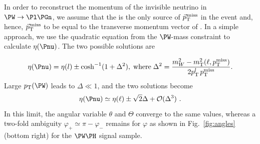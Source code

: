 \documentclass[a4paper,11pt]{article}
\begin{document}
In order to reconstruct the momentum of the invisible neutrino in $\PW\rightarrow\Pl\Pgn$, we assume that the \Pnu is the only source of ${\vec p}_{\mathrm{T}}^{\kern1pt\text{miss}}$ in the event and, hence, ${\vec p}_{\mathrm{T}}^{\kern1pt\text{miss}}$ to be equal to the transverse momentum vector of \Pnu. 
In a simple approach, we use the quadratic equation from the $\PW$-mass constraint to calculate $\eta(\Pnu)$. 
The two possible solutions are

\begin{equation}
\eta(\Pnu) = {\eta}(l) \pm \cosh^{-1}(1+{\Delta}^2),\;\textrm{where}\;{\Delta}^2 = \frac{m_W^2 - m_\textrm{T}^2 (\ell,{p_\textrm{T}^\text{miss}\xspace})}{2 p_\textrm{T}^{l}\, p_\textrm{T}^\textrm{miss}}. 
\label{Eq:NeuEta}
\end{equation}
Large $\pt(\PW)$ leads to $\Delta \ll 1$, and the two solutions become 
\begin{equation}
{\eta}(\Pnu) \simeq {\eta}(\ell) \pm \sqrt{2}{\Delta} + {\cal{O}} ({\Delta}^3)	\ .
\label{Eq:NeuEta2}
\end{equation}
In this limit,  the angular variable $\theta$ and $\Theta$ converge to the same values, whereas a two-fold ambiguity  $\varphi_{+} \simeq \pi - \varphi_{-}$ remains for $\varphi$ as shown in Fig.~\ref{fig:angles} (bottom right) for the $\PW\PH$ signal sample.
\end{document}
